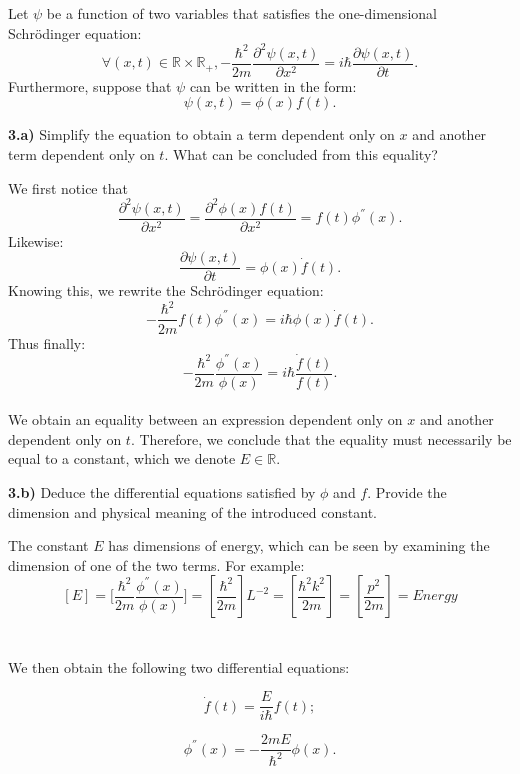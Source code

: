 \noindent Let $\psi$ be a function of two variables that satisfies the one-dimensional Schrödinger equation: 
\begin{equation}
    \forall (x, t) \in \mathbb{R} \times \mathbb{R}_{+}, - \frac{\hbar ^2}{2m}\frac{\partial^2\psi(x,t)}{\partial x^2} = i\hbar\frac{\partial\psi(x,t)}{\partial t}.
\end{equation}
\noindent Furthermore, suppose that $\psi$ can be written in the form: 
\begin{equation}
    \psi(x,t) = \phi(x)f(t).
\end{equation}


\noindent \textbf{3.a)} Simplify the equation to obtain a term dependent only on $x$ and another term dependent only on $t$. What can be concluded from this equality? \\

\begin{breakbox}
\noindent We first notice that $$\frac{\partial^2\psi(x,t)}{\partial x^2} = \frac{\partial^2\phi(x)f(t)}{\partial x^2} = f(t)\phi^{''}(x).$$
Likewise:  $$\frac{\partial\psi(x,t)}{\partial t} = \phi(x)\dot{f}(t).$$
Knowing this, we rewrite the Schrödinger equation: $$- \frac{\hbar ^2}{2m}f(t)\phi^{''}(x) = i\hbar\phi(x)\dot{f}(t).$$
Thus finally:
$$\boxed{-\frac{\hbar ^2}{2m}\frac{\phi^{''}(x)}{\phi(x)} = i\hbar\frac{\dot{f}(t)}{f(t)}.}$$\\

\noindent We obtain an equality between an expression dependent only on $x$ and another dependent only on $t$.
Therefore, we conclude that the equality must necessarily be equal to a constant, which we denote $E \in \mathbb{R}$.
\end{breakbox} 

\medskip

\noindent \textbf{3.b)} Deduce the differential equations satisfied by $\phi$ and $f$. Provide the dimension and physical meaning of the introduced constant.\\

\begin{breakbox}

\noindent The constant $E$ has dimensions of energy, which can be seen by examining the dimension of one of the two terms. For example: 
$$[E]=[\frac{\hbar ^2}{2m}\frac{\phi^{''}(x)}{\phi(x)}\big] = [\frac{\hbar ^2}{2m}] L^{-2} = [\frac{\hbar^2 k^2}{2m}] = [\frac{p^2}{2m}] = Energy$$ \\ \\
We then obtain the following two differential equations:

\begin{equation}
    \boxed{\dot{f}(t) = \frac{E}{i\hbar}f(t);}
    \label{a1}
\end{equation}

\begin{equation}
    \boxed{\phi^{''}(x) = -\frac{2mE}{\hbar^2}\phi(x).}
    \label{a2}
\end{equation}
\end{breakbox}

